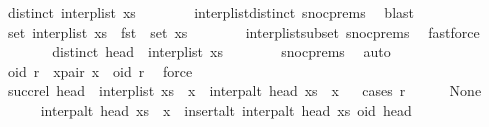 \begin{isabellebody}
\ {\isachardoublequoteopen}distinct\ {\isacharparenleft}interp{\isacharunderscore}list\ xs{\isacharparenright}{\isachardoublequoteclose}\isanewline
\ \ \ \ \ \ \isamarkupfalse%
\ interp{\isacharunderscore}list{\isacharunderscore}distinct\ snoc{\isachardot}prems{\isacharparenleft}{}{\isacharparenright}\ \isamarkupfalse%
\ blast\isanewline
\ \ \ \ \isamarkupfalse%
\ \isamarkupfalse%
\ {\isachardoublequoteopen}set\ {\isacharparenleft}interp{\isacharunderscore}list\ xs{\isacharparenright}\ {\isasymsubseteq}\ fst\ {\isacharbackquote}\ set\ xs{\isachardoublequoteclose}\isanewline
\ \ \ \ \ \ \isamarkupfalse%
\ interp{\isacharunderscore}list{\isacharunderscore}subset\ snoc{\isachardot}prems{\isacharparenleft}{}{\isacharparenright}\ \isamarkupfalse%
\ fastforce\isanewline
\ \ \ \ \isamarkupfalse%
\ \isamarkupfalse%
\ {\isachardoublequoteopen}distinct\ {\isacharparenleft}head\ {\isacharhash}\ interp{\isacharunderscore}list\ xs{\isacharparenright}{\isachardoublequoteclose}\isanewline
\ \ \ \ \ \ \isamarkupfalse%
\ snoc{\isachardot}prems{\isacharparenleft}{}{\isacharparenright}\ \isamarkupfalse%
\ auto\isanewline
\ \ \isamarkupfalse%
\isanewline
\ \ \isamarkupfalse%
\ oid\ r\ \ x{\isacharunderscore}pair{\isacharcolon}\ {\isachardoublequoteopen}x\ {\isacharequal}\ {\isacharparenleft}oid{\isacharcomma}\ r{\isacharparenright}{\isachardoublequoteclose}\ \isamarkupfalse%
\ force\isanewline
\ \ \isamarkupfalse%
\ \isamarkupfalse%
\ {\isachardoublequoteopen}succ{\isacharunderscore}rel\ {\isacharparenleft}head\ {\isacharhash}\ interp{\isacharunderscore}list\ {\isacharparenleft}xs\ {\isacharat}\ {\isacharbrackleft}x{\isacharbrackright}{\isacharparenright}{\isacharparenright}\ {\isacharequal}\ interp{\isacharunderscore}alt\ head\ {\isacharparenleft}xs\ {\isacharat}\ {\isacharbrackleft}x{\isacharbrackright}{\isacharparenright}{\isachardoublequoteclose}\isanewline
\ \ \isamarkupfalse%
{\isacharparenleft}cases\ r{\isacharparenright}\isanewline
\ \ \ \ \isamarkupfalse%
\ None\isanewline
\ \ \ \ \isamarkupfalse%
\ {\isachardoublequoteopen}interp{\isacharunderscore}alt\ head\ {\isacharparenleft}xs\ {\isacharat}\ {\isacharbrackleft}x{\isacharbrackright}{\isacharparenright}\ {\isacharequal}\ insert{\isacharunderscore}alt\ {\isacharparenleft}interp{\isacharunderscore}alt\ head\ xs{\isacharparenright}\ {\isacharparenleft}oid{\isacharcomma}\ head{\isacharparenright}{\isachardoublequoteclose}\isanewline

\end{isabellebody}
